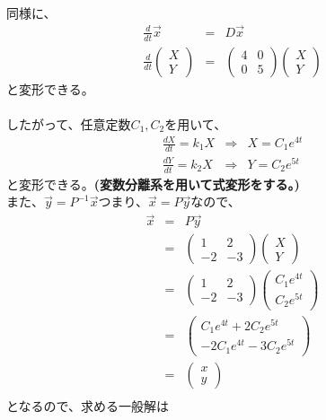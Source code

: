 \documentclass[dvipdfmx,uplatex]{jsarticle}
\begin{document}
\begin{spacing}{1.6}
\begin{qparts}
  同様に、
  \begin{eqnarray*}
    \frac{d}{dt}\overrightarrow x & = & D \overrightarrow x \\
    \frac{d}{dt}
    \left(
    \begin{array}{ccc}
    X \\
    Y
    \end{array}
    \right)
    & = &
    \left(
    \begin{array}{ccc}
    4 & 0 \\
    0 & 5
    \end{array}
    \right)
    \left(
    \begin{array}{ccc}
    X \\
    Y
    \end{array}
    \right)
  \end{eqnarray*}
  と変形できる。\\\\
  したがって、任意定数$C_1, C_2$を用いて、
  \begin{eqnarray*}
    \frac{dX}{dt} = k_1X & \Rightarrow & X  = C_1e ^{4t}\\
    \frac{dY}{dt} = k_2X & \Rightarrow & Y  = C_2e ^{5t}
  \end{eqnarray*}
  と変形できる。{\bf (変数分離系を用いて式変形をする。)}\\
  また、$\overrightarrow y = P^{-1} \overrightarrow x$つまり、$\overrightarrow x = P \overrightarrow y$なので、
  \begin{eqnarray*}
    \overrightarrow x & = & P \overrightarrow y \\
    & = &
    \left(
    \begin{array}{ccc}
    1 & 2 \\
    -2 & -3
    \end{array}
    \right)
    \left(
    \begin{array}{ccc}
    X \\
    Y
    \end{array}
    \right) \\
    & = &
    \left(
    \begin{array}{ccc}
    1 & 2 \\
    -2 & -3
    \end{array}
    \right)
    \left(
    \begin{array}{ccc}
    C_1 e ^ {4t} \\
    C_2 e ^ {5t}
    \end{array}
    \right) \\
    & = &
    \left(
    \begin{array}{ccc}
    C_1 e ^ {4t} + 2 C_2 e ^ {5t} \\
    -2C_1 e ^ {4t} - 3 C_2 e ^ {5t}
    \end{array}
    \right) \\
    & = &
    \left(
    \begin{array}{ccc}
    x \\
    y
    \end{array}
    \right) \\
  \end{eqnarray*}
  となるので、求める一般解は


\end{qparts}
\end{spacing}
\end{document}
